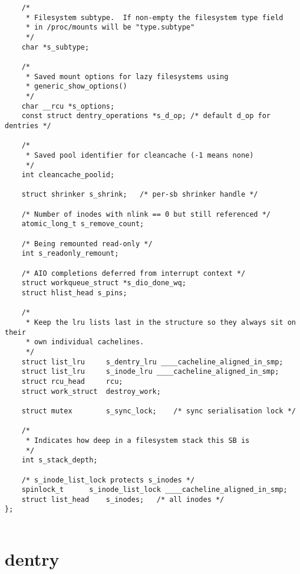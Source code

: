\begin{lstlisting}
	/*
	 * Filesystem subtype.  If non-empty the filesystem type field
	 * in /proc/mounts will be "type.subtype"
	 */
	char *s_subtype;

	/*
	 * Saved mount options for lazy filesystems using
	 * generic_show_options()
	 */
	char __rcu *s_options;
	const struct dentry_operations *s_d_op; /* default d_op for dentries */

	/*
	 * Saved pool identifier for cleancache (-1 means none)
	 */
	int cleancache_poolid;

	struct shrinker s_shrink;	/* per-sb shrinker handle */

	/* Number of inodes with nlink == 0 but still referenced */
	atomic_long_t s_remove_count;

	/* Being remounted read-only */
	int s_readonly_remount;

	/* AIO completions deferred from interrupt context */
	struct workqueue_struct *s_dio_done_wq;
	struct hlist_head s_pins;

	/*
	 * Keep the lru lists last in the structure so they always sit on their
	 * own individual cachelines.
	 */
	struct list_lru		s_dentry_lru ____cacheline_aligned_in_smp;
	struct list_lru		s_inode_lru ____cacheline_aligned_in_smp;
	struct rcu_head		rcu;
	struct work_struct	destroy_work;

	struct mutex		s_sync_lock;	/* sync serialisation lock */

	/*
	 * Indicates how deep in a filesystem stack this SB is
	 */
	int s_stack_depth;

	/* s_inode_list_lock protects s_inodes */
	spinlock_t		s_inode_list_lock ____cacheline_aligned_in_smp;
	struct list_head	s_inodes;	/* all inodes */
};
        
\end{lstlisting}


\section{dentry}

